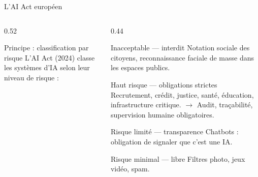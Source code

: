 \documentclass[aspectratio=169, 10pt]{beamer}
\begin{document}
\begin{frame}[shrink=3]{L'AI Act européen}
  \begin{columns}[T]
    \begin{column}{0.52\textwidth}
      \begin{block}{Principe : classification par risque}
        L'AI Act (2024) classe les systèmes d'IA
        selon leur niveau de risque :
      \end{block}
      \begin{center}
      \end{center}
    \end{column}
    \begin{column}{0.44\textwidth}
      \begin{alertblock}{Inacceptable --- interdit}
        Notation sociale des citoyens,
        reconnaissance faciale de masse
        dans les espaces publics.
      \end{alertblock}
      \begin{alertblock}{Haut risque --- obligations strictes}
        Recrutement, crédit, justice, santé,
        éducation, infrastructure critique.
        $\to$ Audit, traçabilité, supervision humaine obligatoires.
      \end{alertblock}
      \begin{block}{Risque limité --- transparence}
        Chatbots : obligation de signaler
        que c'est une IA.
      \end{block}
      \begin{exampleblock}{Risque minimal --- libre}
        Filtres photo, jeux vidéo, spam.
      \end{exampleblock}
    \end{column}
  \end{columns}
\end{frame}
\end{document}
